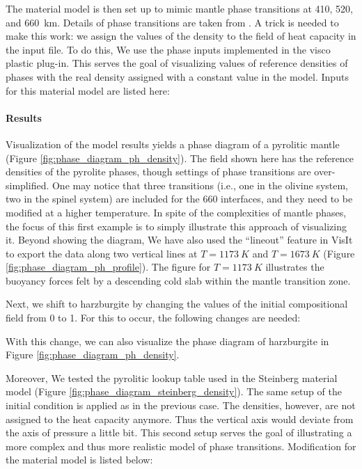 \par The material model is then set up to mimic mantle phase transitions at 410, 520, and \SI{660}{km}. %
Details of phase transitions are taken from \cite{billen2018decoupling}.
A trick is needed to make this work: we assign the values of the density to the field of heat capacity in the input file. %
To do this, We use the phase inputs implemented in the visco plastic plug-in.
This serves the goal of visualizing values of reference densities of phases with the real density assigned with a constant value in the model.
Inputs for this material model are listed here:



\paragraph{Results}

\par Visualization of the model results yields a phase diagram of a pyrolitic mantle (Figure \ref{fig:phase_diagram_ph_density}). %
The field shown here has the reference densities of the pyrolite phases, though settings of phase transitions are over-simplified.
One may notice that three transitions (i.e., one in the olivine system, two in the spinel system) are included for the 660 interfaces, %
and they need to be modified at a higher temperature.
In spite of the complexities of mantle phases, the focus of this first example is to simply illustrate this approach of visualizing it.
Beyond showing the diagram, We have also used the ``lineout'' feature in VisIt to export the data along two vertical lines at $T = \SI{1173}{K}$ and $T = \SI{1673}{K}$ (Figure \ref{fig:phase_diagram_ph_profile}). %
The figure for $T = \SI{1173}{K}$ illustrates the buoyancy forces felt by a descending cold slab within the mantle transition zone.

\par Next, we shift to harzburgite by changing the values of the initial compositional field from 0 to 1.  %
For this to occur, the following changes are needed:

With this change, we can also visualize the phase diagram of harzburgite in Figure \ref{fig:phase_diagram_ph_density}.

\par Moreover, We tested the pyrolitic lookup table used in the Steinberg material model (Figure \ref{fig:phase_diagram_steinberg_density}).%
The same setup of the initial condition is applied as in the previous case. %
The densities, however, are not assigned to the heat capacity anymore.
Thus the vertical axis would deviate from the axis of pressure a little bit.
This second setup serves the goal of illustrating a more complex and thus more realistic model of phase transitions.
Modification for the material model is listed below:

